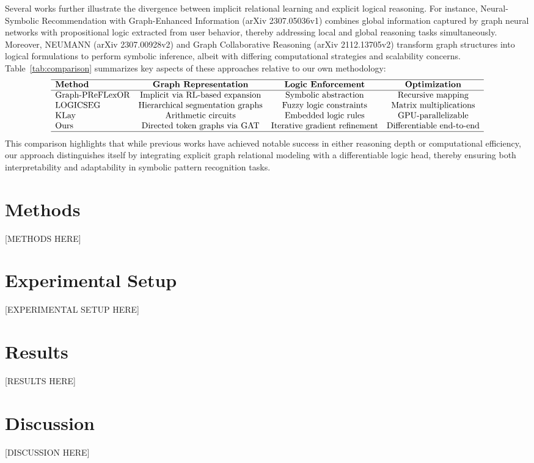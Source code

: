 \documentclass{article}
\begin{document}
Several works further illustrate the divergence between implicit relational learning and explicit logical reasoning. For instance, Neural-Symbolic Recommendation with Graph-Enhanced Information (arXiv 2307.05036v1) combines global information captured by graph neural networks with propositional logic extracted from user behavior, thereby addressing local and global reasoning tasks simultaneously. Moreover, NEUMANN (arXiv 2307.00928v2) and Graph Collaborative Reasoning (arXiv 2112.13705v2) transform graph structures into logical formulations to perform symbolic inference, albeit with differing computational strategies and scalability concerns. Table~\ref{tab:comparison} summarizes key aspects of these approaches relative to our own methodology:
\[
\begin{array}{lccc}
\hline
\textbf{Method} & \textbf{Graph Representation} & \textbf{Logic Enforcement} & \textbf{Optimization} \\
\hline
\text{Graph-PReFLexOR} & \text{Implicit via RL-based expansion} & \text{Symbolic abstraction} & \text{Recursive mapping} \\
\text{LOGICSEG} & \text{Hierarchical segmentation graphs} & \text{Fuzzy logic constraints} & \text{Matrix multiplications} \\
\text{KLay} & \text{Arithmetic circuits} & \text{Embedded logic rules} & \text{GPU-parallelizable} \\
\text{Ours} & \text{Directed token graphs via GAT} & \text{Iterative gradient refinement} & \text{Differentiable end-to-end} \\
\hline
\end{array}
\]
This comparison highlights that while previous works have achieved notable success in either reasoning depth or computational efficiency, our approach distinguishes itself by integrating explicit graph relational modeling with a differentiable logic head, thereby ensuring both interpretability and adaptability in symbolic pattern recognition tasks.

\section{Methods}
[METHODS HERE]

\section{Experimental Setup}
[EXPERIMENTAL SETUP HERE]

\section{Results}
[RESULTS HERE]

\section{Discussion}
[DISCUSSION HERE]
\end{document}
